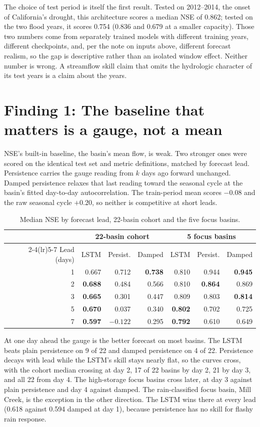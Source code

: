 \documentclass[11pt]{article}
\newcommand{\finding}[1]{\section*{#1}}
\begin{document}
The choice of test period is itself the first result. Tested on 2012--2014, the onset of
California's drought, this architecture scores a median NSE of 0.862; tested on the two
flood years, it scores 0.754 (0.836 and 0.679 at a smaller capacity). Those two numbers
come from separately trained models with different training years, different checkpoints,
and, per the note on inputs above, different forecast realism, so the gap is descriptive
rather than an isolated window effect. Neither number is wrong. A streamflow skill claim
that omits the hydrologic character of its test years is a claim about the years.

\finding{Finding 1: The baseline that matters is a gauge, not a mean}

NSE's built-in baseline, the basin's mean flow, is weak. Two stronger ones were scored on
the identical test set and metric definitions, matched by forecast lead. Persistence
carries the gauge reading from $k$ days ago forward unchanged. Damped persistence relaxes
that last reading toward the seasonal cycle at the basin's fitted day-to-day
autocorrelation. The train-period mean scores $-0.08$ and the raw seasonal cycle $+0.20$,
so neither is competitive at short leads.

\begin{table}[htbp]
\centering
\caption{Median NSE by forecast lead, 22-basin cohort and the five focus basins.}
\label{tab:persistence}
\begin{tabular}{rrrrrrr}
\toprule
& \multicolumn{3}{c}{22-basin cohort} & \multicolumn{3}{c}{5 focus basins} \\
\cmidrule(lr){2-4}\cmidrule(lr){5-7}
Lead (days) & LSTM & Persist. & Damped & LSTM & Persist. & Damped \\
\midrule
1 & 0.667 & 0.712 & \textbf{0.738} & 0.810 & 0.944 & \textbf{0.945} \\
2 & \textbf{0.688} & 0.484 & 0.566 & 0.810 & \textbf{0.864} & 0.869 \\
3 & \textbf{0.665} & 0.301 & 0.447 & 0.809 & 0.803 & \textbf{0.814} \\
5 & \textbf{0.670} & 0.037 & 0.340 & \textbf{0.802} & 0.702 & 0.725 \\
7 & \textbf{0.597} & $-0.122$ & 0.295 & \textbf{0.792} & 0.610 & 0.649 \\
\bottomrule
\end{tabular}
\end{table}

At one day ahead the gauge is the better forecast on most basins. The LSTM beats plain
persistence on 9 of 22 and damped persistence on 4 of 22. Persistence decays with lead
while the LSTM's skill stays nearly flat, so the curves cross, with the cohort median
crossing at day 2, 17 of 22 basins by day 2, 21 by day 3, and all 22 from day 4. The
high-storage focus basins cross later, at day 3 against plain persistence and day 4
against damped. The rain-classified focus basin, Mill Creek, is the exception in the other
direction. The LSTM wins there at every lead (0.618 against 0.594 damped at day 1),
because persistence has no skill for flashy rain response.
\end{document}
